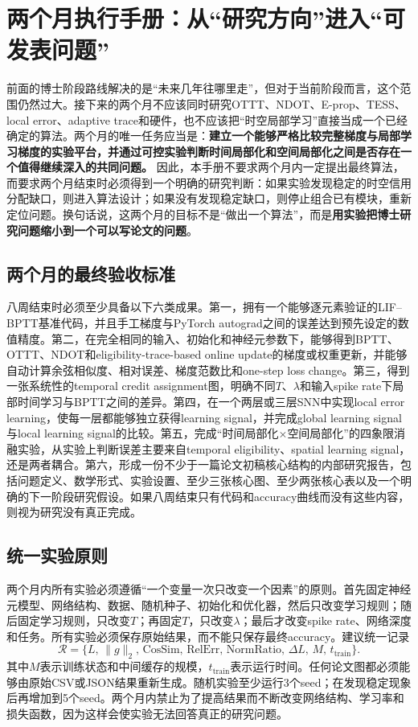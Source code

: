 \documentclass[journal,12pt,onecolumn]{IEEEtran}
\begin{document}
\section{两个月执行手册：从“研究方向”进入“可发表问题”}

前面的博士阶段路线解决的是“未来几年往哪里走”，但对于当前阶段而言，这个范围仍然过大。接下来的两个月不应该同时研究OTTT、NDOT、E-prop、TESS、local error、adaptive trace和硬件，也不应该把“时空局部学习”直接当成一个已经确定的算法。两个月的唯一任务应当是：\textbf{建立一个能够严格比较完整梯度与局部学习梯度的实验平台，并通过可控实验判断时间局部化和空间局部化之间是否存在一个值得继续深入的共同问题。} 因此，本手册不要求两个月内一定提出最终算法，而要求两个月结束时必须得到一个明确的研究判断：如果实验发现稳定的时空信用分配缺口，则进入算法设计；如果没有发现稳定缺口，则停止组合已有模块，重新定位问题。换句话说，这两个月的目标不是“做出一个算法”，而是\textbf{用实验把博士研究问题缩小到一个可以写论文的问题}。

\subsection{两个月的最终验收标准}

八周结束时必须至少具备以下六类成果。第一，拥有一个能够逐元素验证的LIF--BPTT基准代码，并且手工梯度与PyTorch autograd之间的误差达到预先设定的数值精度。第二，在完全相同的输入、初始化和神经元参数下，能够得到BPTT、OTTT、NDOT和eligibility-trace-based online update的梯度或权重更新，并能够自动计算余弦相似度、相对误差、梯度范数比和one-step loss change。第三，得到一张系统性的temporal credit assignment图，明确不同$T$、$\lambda$和输入spike rate下局部时间学习与BPTT之间的差异。第四，在一个两层或三层SNN中实现local error learning，使每一层都能够独立获得learning signal，并完成global learning signal与local learning signal的比较。第五，完成“时间局部化$\times$空间局部化”的四象限消融实验，从实验上判断误差主要来自temporal eligibility、spatial learning signal，还是两者耦合。第六，形成一份不少于一篇论文初稿核心结构的内部研究报告，包括问题定义、数学形式、实验设置、至少三张核心图、至少两张核心表以及一个明确的下一阶段研究假设。如果八周结束只有代码和accuracy曲线而没有这些内容，则视为研究没有真正完成。

\subsection{统一实验原则}

两个月内所有实验必须遵循“一个变量一次只改变一个因素”的原则。首先固定神经元模型、网络结构、数据、随机种子、初始化和优化器，然后只改变学习规则；随后固定学习规则，只改变$T$；再固定$T$，只改变$\lambda$；最后才改变spike rate、网络深度和任务。所有实验必须保存原始结果，而不能只保存最终accuracy。建议统一记录
\begin{equation}
\mathcal{R}=
\{
L,\,
\|g\|_2,\,
\mathrm{CosSim},\,
\mathrm{RelErr},\,
\mathrm{NormRatio},\,
\Delta L,\,
M,\,
t_{\mathrm{train}}
\}.
\end{equation}
其中$M$表示训练状态和中间缓存的规模，$t_{\mathrm{train}}$表示运行时间。任何论文图都必须能够由原始CSV或JSON结果重新生成。随机实验至少运行3个seed；在发现稳定现象后再增加到5个seed。两个月内禁止为了提高结果而不断改变网络结构、学习率和损失函数，因为这样会使实验无法回答真正的研究问题。
\end{document}
